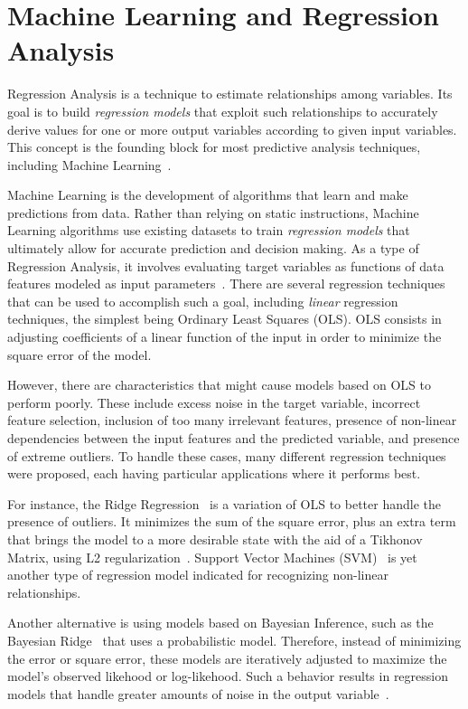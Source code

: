 \section{Machine Learning and Regression Analysis}
\label{sec:ml}
Regression Analysis is a technique to estimate relationships among variables.
Its goal is to build \textit{regression models} that exploit such relationships
to accurately derive values for one or more output variables according to given
input variables. This concept is the founding block for most predictive
analysis techniques, including Machine Learning~\citep{murphy2012machine}.

Machine Learning is the development of algorithms that learn and make
predictions from data. Rather than relying on static instructions, Machine
Learning algorithms use existing datasets to train \textit{regression models}
that ultimately allow for accurate prediction and decision making. As a type of
Regression Analysis, it involves evaluating target variables as functions of
data features modeled as input parameters~\citep{murphy2012machine}. There are
several regression techniques that can be used to accomplish such a goal,
including \textit{linear} regression techniques, the simplest being Ordinary
Least Squares (OLS). OLS consists in adjusting coefficients of a linear
function of the input in order to minimize the square error of the model.

However, there are characteristics that might cause models based on OLS to
perform poorly. These include excess noise in the target variable, incorrect
feature selection, inclusion of too many irrelevant features, presence of
non-linear dependencies between the input features and the predicted variable,
and presence of extreme outliers. To handle these cases, many different
regression techniques were proposed, each having particular applications where
it performs best.

For instance, the Ridge Regression~\citep{hoerl1970ridge} is a variation of OLS
to better handle the presence of outliers. It minimizes the sum of the square
error, plus an extra term that brings the model to a more desirable state with
the aid of a Tikhonov Matrix, using L2
regularization~\citep{mohri2012foundations}. Support Vector Machines
(SVM)~\citep{smola1997support} is yet another type of regression model
indicated for recognizing non-linear relationships.

Another alternative is using models based on Bayesian Inference, such as the
Bayesian Ridge~\citep{mackay1992bayesian} that uses a probabilistic model.
Therefore, instead of minimizing the error or square error, these models are
iteratively adjusted to maximize the model's observed likehood or log-likehood.
Such a behavior results in regression models that handle greater amounts of
noise in the output variable~\citep{mohri2012foundations}.

